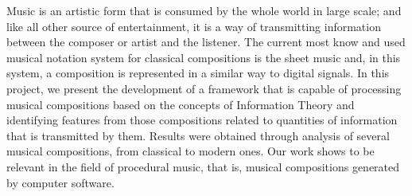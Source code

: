Music is an artistic form that is consumed by the whole world in large scale; and like all other source of entertainment, it is a way of transmitting information between the composer or artist and the listener. The current most know and used musical notation system for classical compositions is the sheet music and, in this system, a composition is represented in a similar way to digital signals. In this project, we present the development of a framework that is capable of processing musical compositions based on the concepts of Information Theory and identifying features from those compositions related to quantities of information that is transmitted by them. Results were obtained through analysis of several musical compositions, from classical to modern ones. Our work shows to be relevant in the field of procedural music, that is, musical compositions generated by computer software.
